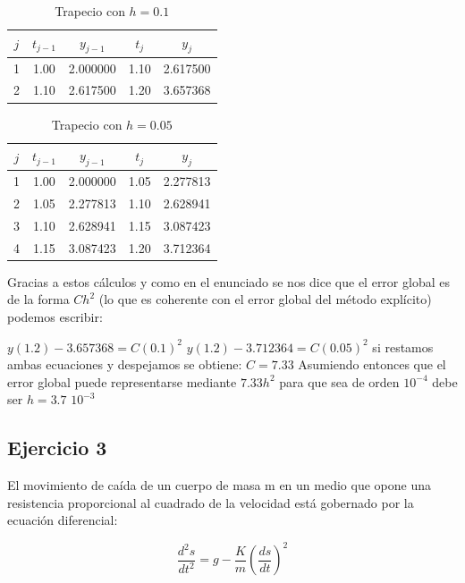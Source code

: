 \documentclass{article}
\theoremstyle{theorem-style}  %
\theoremstyle{definition-style}
\theoremstyle{example-style}
\begin{document}
    \begin{table}[H]
		\centering
		\begin{tabular}{|| c | c | c | c | c ||}
			\hline
			\hline $j$ &  $t_{j-1}$ & $y_{j-1}$ & $t_j$ & $y_j$ \\
			\hline 1 & 1.00 & 2.000000 & 1.10 & 2.617500 \\
			\hline 2 & 1.10 & 2.617500 & 1.20 & 3.657368 \\
			\hline
			\hline
		\end{tabular}
		\caption{Trapecio con $h=0.1$}
		\label{table:trapecio-ej2}
	\end{table}

	 \begin{table}[H]
		\centering
		\begin{tabular}{|| c | c | c | c | c ||}
			\hline
			\hline $j$ &  $t_{j-1}$ & $y_{j-1}$ & $t_j$ & $y_j$ \\
			\hline 1 & 1.00 & 2.000000 & 1.05 & 2.277813 \\
			\hline 2 & 1.05 & 2.277813 & 1.10 & 2.628941 \\
			\hline 3 & 1.10 & 2.628941 & 1.15 & 3.087423 \\
			\hline 4 & 1.15 & 3.087423 & 1.20 & 3.712364 \\
			\hline
			\hline
		\end{tabular}
		\caption{Trapecio con $h=0.05$}
		\label{table:trapecio-ej2.1}
	\end{table}

	Gracias a estos cálculos y como en el enunciado se nos dice que el error global es de la forma $Ch^2$ (lo que es coherente con el error global del método explícito) podemos escribir:

	$y(1.2) - 3.657368 = C(0.1)^2$
	$y(1.2) - 3.712364 = C(0.05)^2$
si restamos ambas ecuaciones y despejamos se obtiene:
	$C=7.33$
	Asumiendo entonces que el error global puede representarse mediante $7.33 h^2$ para que sea de orden $10^{-4}$ debe ser $h=3.7$ $10^{-3}$

\subsection{Ejercicio 3} \label{ejtp3}
El movimiento de caída de un cuerpo de masa m en un medio que opone una resistencia proporcional al cuadrado de la velocidad está gobernado por la ecuación diferencial:

\begin{equation}
\frac{d^2s}{dt^2}=g-\frac{K}{m}(\frac{ds}{dt})^2
\end{equation}
\end{document}
